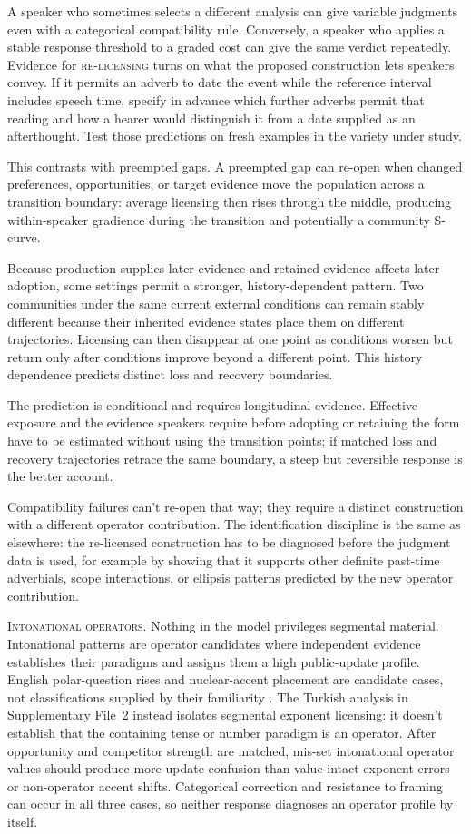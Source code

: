 \documentclass[12pt,letterpaper]{article}
\newcommand{\term}[1]{\textsc{#1}}
\begin{document}
A speaker who sometimes selects a different analysis can give variable
judgments even with a categorical compatibility rule. Conversely, a speaker
who applies a stable response threshold to a graded cost can give the same
verdict repeatedly. Evidence for \term{re-licensing} turns on
what the proposed construction lets speakers convey. If it permits an
adverb to date the event while the reference interval includes speech time,
specify in advance which further adverbs permit that reading and how a
hearer would distinguish it from a date supplied as an afterthought. Test
those predictions on fresh examples in the variety under study.

This contrasts with preempted gaps. A preempted gap can re-open when changed
preferences, opportunities, or target evidence move the population across a
transition boundary: average licensing then rises through the middle, producing
within-speaker gradience during the transition and potentially a community
S-curve.

Because production supplies later evidence and retained evidence affects later
adoption, some settings permit a stronger, history-dependent pattern. Two
communities under the same current external conditions can remain stably
different because their inherited evidence states place them on different
trajectories. Licensing can then disappear at one point as conditions worsen
but return only after conditions improve beyond a different point. This history
dependence predicts distinct loss and recovery boundaries.

The prediction is conditional and requires longitudinal evidence. Effective
exposure and the evidence speakers require before adopting or retaining the
form have to be estimated without using the transition points; if matched loss and
recovery trajectories retrace the same boundary, a steep but reversible
response is the better account.

Compatibility failures can't re-open that way; they require a distinct
construction with a different operator contribution. The identification discipline is the
same as elsewhere: the re-licensed construction has to be diagnosed before the
judgment data is used, for example by showing that it supports other definite
past-time adverbials, scope interactions, or ellipsis patterns predicted by the
new operator contribution.

\noindent\textsc{Intonational operators.} Nothing in the model privileges
segmental material. Intonational patterns are operator candidates where
independent evidence establishes their paradigms and assigns them a high
public-update profile. English polar-question rises and nuclear-accent placement are
candidate cases, not classifications supplied by their familiarity
\autocite{reynolds2026operators}. The Turkish analysis in Supplementary File~2
instead isolates segmental exponent licensing: it doesn't establish that the
containing tense or number paradigm is an operator. After opportunity and
competitor strength are matched, mis-set intonational operator values should
produce more update confusion than value-intact exponent errors or non-operator
accent shifts. Categorical correction and resistance to framing can occur in
all three cases, so neither response diagnoses an operator profile by
itself.
\end{document}
